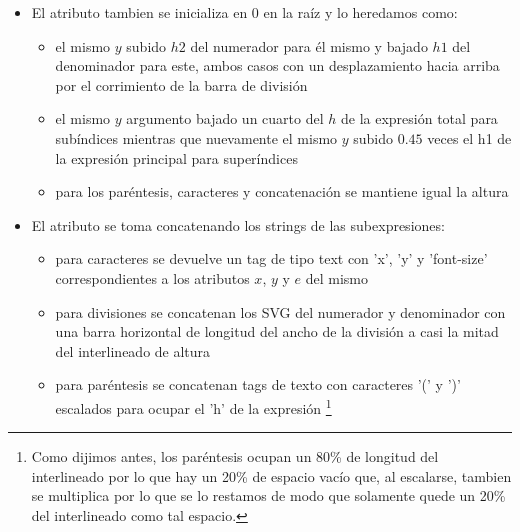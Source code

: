 \begin{itemize}
	\item El atributo \textbf{} tambien se inicializa en 0 en la raíz y lo heredamos como:
	\begin{itemize}
		\item el mismo $y$ subido $h2$ del numerador para él mismo y bajado $h1$ del denominador para este, ambos casos con un desplazamiento hacia arriba por el corrimiento de la barra de división
		\item el mismo $y$ argumento bajado un cuarto del $h$ de la expresión total para subíndices mientras que nuevamente el mismo $y$ subido $0.45$ veces el h1 de la expresión principal para superíndices
		\item para los paréntesis, caracteres y concatenación se mantiene igual la altura
	\end{itemize}

	\item El atributo \textbf{} se toma concatenando los strings de las subexpresiones:
	\begin{itemize}
		\item para caracteres se devuelve un tag de tipo text con 'x', 'y' y 'font-size' correspondientes a los atributos $x$, $y$ y $e$ del mismo
		\item para divisiones se concatenan los SVG del numerador y denominador con una barra horizontal de longitud del ancho de la división a casi la mitad del interlineado de altura
		\item para paréntesis se concatenan tags de texto con caracteres '(' y ')' escalados para ocupar el 'h' de la expresión \footnote{Como dijimos antes, los paréntesis ocupan un 80\% de longitud del interlineado por lo que hay un 20\% de espacio vacío que, al escalarse, tambien se multiplica por lo que se lo restamos de modo que solamente quede un 20\% del interlineado como tal espacio.}
	\end{itemize}
\end{itemize}
